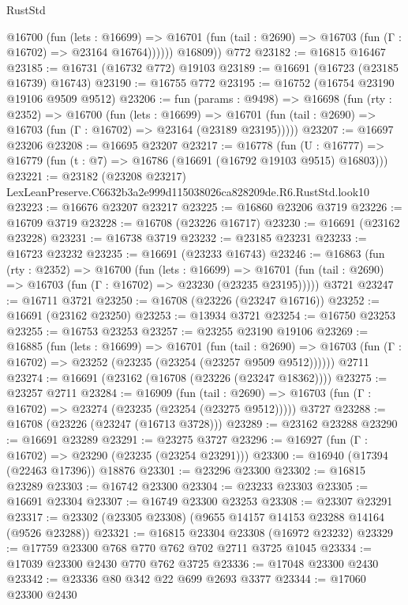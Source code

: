 \begin{lexlean}{RustStd}
\begin{coremodule}
            @16700
              (fun (lets : @16699) =>
              @16701 (fun (tail : @2690) => @16703 (fun (Γ : @16702) => @23164 @16764))))))
        @16809))
    @772
@23182 := @16815 @16467
@23185 := @16731 (@16732 @772) @19103
@23189 := @16691 (@16723 (@23185 @16739) @16743)
@23190 := @16755 @772
@23195 := @16752 (@16754 @23190 @19106 @9509 @9512)
@23206 := fun (params : @9498) =>
  @16698
    (fun (rty : @2352) =>
    @16700
      (fun (lets : @16699) =>
      @16701 (fun (tail : @2690) => @16703 (fun (Γ : @16702) => @23164 (@23189 @23195)))))
@23207 := @16697 @23206
@23208 := @16695 @23207
@23217 := @16778
    (fun (U : @16777) => @16779 (fun (t : @7) => @16786 (@16691 (@16792 @19103 @9515) @16803)))
@23221 := @23182 (@23208 @23217) LexLeanPreserve.C6632b3a2e999d115038026ca828209de.R6.RustStd.look10
@23223 := @16676 @23207 @23217
@23225 := @16860 @23206 @3719
@23226 := @16709 @3719
@23228 := @16708 (@23226 @16717)
@23230 := @16691 (@23162 @23228)
@23231 := @16738 @3719
@23232 := @23185 @23231
@23233 := @16723 @23232
@23235 := @16691 (@23233 @16743)
@23246 := @16863
    (fun (rty : @2352) =>
    @16700
      (fun (lets : @16699) =>
      @16701 (fun (tail : @2690) => @16703 (fun (Γ : @16702) => @23230 (@23235 @23195)))))
    @3721
@23247 := @16711 @3721
@23250 := @16708 (@23226 (@23247 @16716))
@23252 := @16691 (@23162 @23250)
@23253 := @13934 @3721
@23254 := @16750 @23253
@23255 := @16753 @23253
@23257 := @23255 @23190 @19106
@23269 := @16885
    (fun (lets : @16699) =>
    @16701
      (fun (tail : @2690) =>
      @16703 (fun (Γ : @16702) => @23252 (@23235 (@23254 (@23257 @9509 @9512))))))
    @2711
@23274 := @16691 (@23162 (@16708 (@23226 (@23247 @18362))))
@23275 := @23257 @2711
@23284 := @16909
    (fun (tail : @2690) => @16703 (fun (Γ : @16702) => @23274 (@23235 (@23254 (@23275 @9512)))))
    @3727
@23288 := @16708 (@23226 (@23247 (@16713 @3728)))
@23289 := @23162 @23288
@23290 := @16691 @23289
@23291 := @23275 @3727
@23296 := @16927 (fun (Γ : @16702) => @23290 (@23235 (@23254 @23291)))
@23300 := @16940 (@17394 (@22463 @17396)) @18876
@23301 := @23296 @23300
@23302 := @16815 @23289
@23303 := @16742 @23300
@23304 := @23233 @23303
@23305 := @16691 @23304
@23307 := @16749 @23300 @23253
@23308 := @23307 @23291
@23317 := @23302 (@23305 @23308) (@9655 @14157 @14153 @23288 @14164 (@9526 @23288))
@23321 := @16815 @23304 @23308 (@16972 @23232)
@23329 := @17759 @23300 @768 @770 @762 @702 @2711 @3725 @1045
@23334 := @17039 @23300 @2430 @770 @762 @3725
@23336 := @17048 @23300 @2430
@23342 := @23336 @80 @342 @22 @699 @2693 @3377
@23344 := @17060 @23300 @2430

\end{coremodule}
\end{lexlean}
